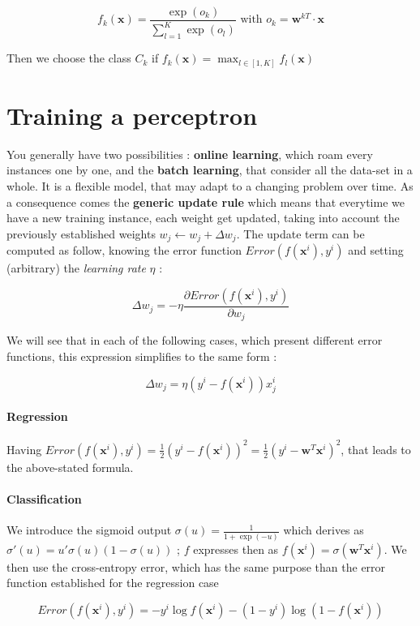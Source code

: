 \documentclass[a4paper,12pt]{article}
\newcommand{\xx}{{\bm x}}
\newcommand{\ww}{{\bm w}}
\begin{document}
\[  f_k(\xx) =  \frac{\exp(o_k)}{\sum_{l=1}^K \exp(o_l)} \text{ with } o_k = \ww ^{kT} \cdot \xx \]

Then we choose the class $C_k$ if $f_k(\xx) = \max_{l \in [1,K]} f_l(\xx) $
\section{Training a perceptron}

\indent
You generally have two possibilities : {\bfseries online learning}, which roam every instances one by one, and the {\bfseries batch learning}, that consider all the data-set in a whole. It is a flexible model, that may adapt to a changing problem over time. As a consequence comes the {\bfseries generic update rule} which means that everytime we have a new training instance, each weight get updated, taking into account the previously established weights $w_j \leftarrow w_j + \Delta w_j $. The update term can be computed as follow, knowing the error function $Error(f(\xx^i),y^i)$ and setting (arbitrary) the \emph{learning rate} $\eta$ :

\[ \Delta w_j = - \eta \frac{\partial Error(f(\xx^i), y^i)}{\partial w_j} \]

We will see that in each of the following cases, which present different error functions, this expression simplifies to the same form :

\[ \Delta w_j = \eta (y^i - f(\xx^i) ) x_j^i \]

\vspace{0.1in}

\paragraph*{Regression}
Having $Error(f(\xx^i),y^i) = \frac{1}{2} (y^i - f(\xx^i))^2 = \frac{1}{2} (y^i - \ww ^T \xx^i)^2$, that leads to the above-stated formula.

\paragraph*{Classification}
We introduce the sigmoid output $\sigma (u) = \frac{1}{1 + \exp(-u)}$ which derives as $\sigma'(u) = u'\sigma (u) (1 - \sigma(u))$ ; $f$ expresses then as $f(\xx^i) = \sigma (\ww^T\xx^i) $. 
We then use the cross-entropy error, which has the same purpose than the error function established for the regression case 

\[ Error(f(\xx^i), y^i) = -y^i \log f(\xx^i) - (1-y^i) \log (1-f(\xx^i)) \]
\end{document}

